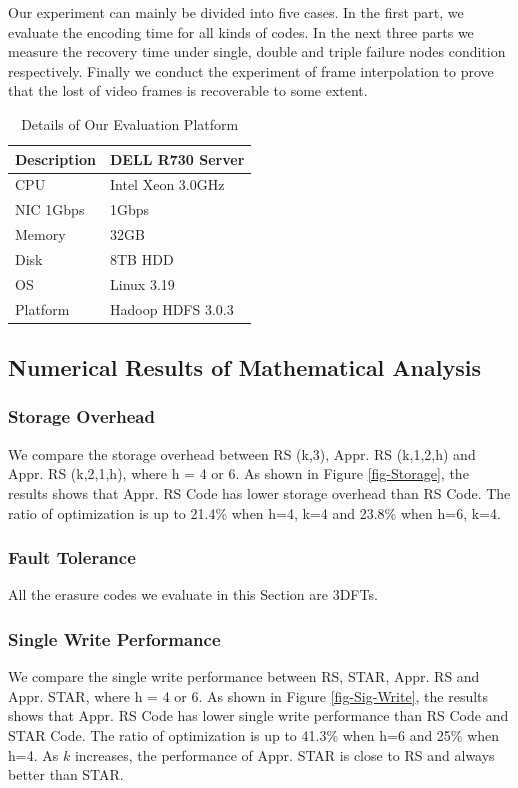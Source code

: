 \documentclass[sigconf]{acmart}
\begin{document}
Our experiment can mainly be divided into five cases. In the first part, we evaluate the encoding time for all kinds of codes. In the next three parts we measure the recovery time under single, double and triple failure nodes condition respectively. Finally we conduct the experiment of frame interpolation to prove that the lost of video frames is recoverable to some extent.

\begin{table}[!ht]
\begin{tabular}{|l|l|}
\hline
Description & DELL R730 Server \\ \hline
CPU & Intel Xeon 3.0GHz \\ \hline
NIC 1Gbps & 1Gbps \\ \hline
Memory & 32GB \\ \hline
Disk & 8TB HDD \\ \hline
OS & Linux 3.19 \\ \hline
Platform & Hadoop HDFS 3.0.3 \\ \hline
\end{tabular}
\caption{Details of Our Evaluation Platform}\label{tab-platform}
\end{table}

\subsection{Numerical Results of Mathematical Analysis}
\subsubsection{Storage Overhead}
We compare the storage overhead between RS (k,3), Appr. RS (k,1,2,h) and Appr. RS (k,2,1,h), where h = 4 or 6. As shown in Figure \ref{fig-Storage}, the results shows that Appr. RS Code has lower storage overhead than RS Code. The ratio of optimization is up to 21.4\% when h=4, k=4 and 23.8\% when h=6, k=4.

\subsubsection{Fault Tolerance}
All the erasure codes we evaluate in this Section are 3DFTs.

\subsubsection{Single Write Performance}
We compare the single write performance between RS, STAR, Appr. RS and Appr. STAR, where h = 4 or 6. As shown in Figure \ref{fig-Sig-Write}, the results shows that Appr. RS Code has lower single write performance than RS Code and STAR Code. The ratio of optimization is up to 41.3\% when h=6 and 25\% when h=4. As $k$ increases, the performance of Appr. STAR is close to RS and always better than STAR.
\end{document}
